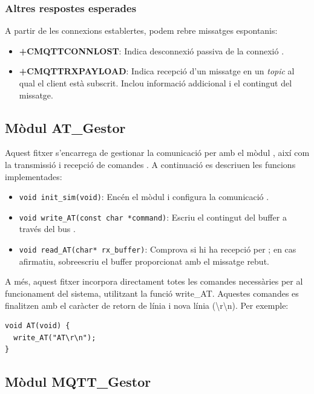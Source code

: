 \documentclass{tfgitic}[2024/07/01]
\begin{document}
\subsubsection{Altres respostes esperades} 
A partir de les connexions establertes, podem rebre missatges espontanis:
\begin{itemize}
  \item \textbf{+CMQTTCONNLOST}: Indica desconnexió passiva de la connexió .
  
  \item \textbf{+CMQTTRXPAYLOAD}: Indica recepció d'un missatge en un \textit{topic} al qual el client està subscrit. Inclou informació addicional i el contingut del missatge.
\end{itemize}

\subsection{Mòdul AT\_Gestor}

Aquest fitxer s'encarrega de gestionar la comunicació per  amb el mòdul , així com la transmissió i recepció de comandes . A continuació es 
descriuen les funcions implementades:

\begin{itemize}
  \item \texttt{void init\_sim(void)}: Encén el mòdul  i configura la comunicació .

  \item \texttt{void write\_AT(const char *command)}: Escriu el contingut del buffer a través del bus .

  \item \texttt{void read\_AT(char* rx\_buffer)}: Comprova si hi ha recepció per ; en cas afirmatiu, sobreescriu el buffer proporcionat 
  amb el missatge rebut.
\end{itemize}

A més, aquest fitxer incorpora directament totes les comandes  necessàries per al funcionament del sistema, utilitzant la funció write\_AT. 
Aquestes comandes es finalitzen amb el caràcter de retorn de línia i nova línia (\textbackslash r\textbackslash n). Per exemple:

\begin{verbatim}
void AT(void) {
  write_AT("AT\r\n");
}
\end{verbatim}

\subsection{Mòdul MQTT\_Gestor}
\end{document}
